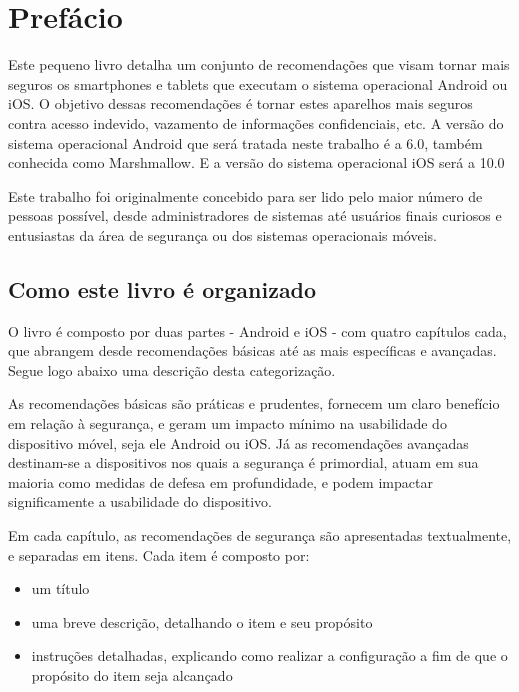 \chapter*{Pref\'acio}

Este pequeno livro detalha um conjunto de recomenda\c c\~oes que visam tornar mais seguros os smartphones e tablets que executam o sistema operacional Android ou iOS. O objetivo dessas recomenda\c c\~oes \'e tornar estes aparelhos mais seguros contra acesso indevido, vazamento de informa\c c\~oes confidenciais, etc. A vers\~ao do sistema operacional Android que ser\'a tratada neste trabalho \'e a 6.0, tamb\'em conhecida como Marshmallow. E a vers\~ao do sistema operacional iOS ser\'a a 10.0

Este trabalho foi originalmente concebido para ser lido pelo maior n\'umero de pessoas poss\'ivel, desde administradores de sistemas at\'e usu\'arios finais curiosos e entusiastas da \'area de seguran\c ca ou dos sistemas operacionais m\'oveis.

\section*{Como este livro \'e organizado}

O livro \'e composto por duas partes - Android e iOS - com quatro cap\'itulos cada, que abrangem desde recomenda\c c\~oes b\'asicas at\'e as mais espec\'ificas e avan\c cadas. Segue logo abaixo uma descri\c c\~ao desta categoriza\c c\~ao. 

As recomenda\c c\~oes b\'asicas s\~ao pr\'aticas e prudentes, fornecem um claro benef\'icio em rela\c c\~ao \`a seguran\c ca, e geram um impacto m\'inimo na usabilidade do dispositivo m\'ovel, seja ele Android ou iOS. J\'a as recomenda\c c\~oes avan\c cadas destinam-se a dispositivos nos quais a seguran\c ca \'e primordial, atuam em sua maioria como medidas de defesa em profundidade, e podem impactar significamente a usabilidade do dispositivo.

Em cada cap\'itulo, as recomenda\c c\~oes de seguran\c ca s\~ao apresentadas textualmente, e separadas em itens. Cada item \'e composto por:

\begin{itemize}
\item um t\'itulo
\item uma breve descri\c c\~ao, detalhando o item e seu prop\'osito
\item instru\c c\~oes detalhadas, explicando como realizar a configura\c c\~ao a fim de que o prop\'osito do item seja alcan\c cado
\end{itemize}

